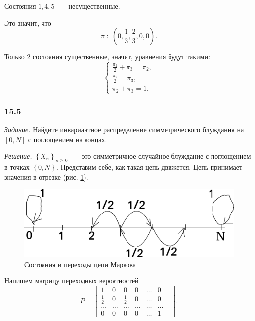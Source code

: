 \begin{enumerate}[label=\alph*)]
Состояния $1, 4, 5$~---~несущественные.

Это значит, что
\begin{equation*}
  \pi \; : \;
  \left( 0, \frac{1}{3}, \frac{2}{3}, 0, 0 \right).
\end{equation*}

Только 2 состояния существенные, значит, уравнения будут такими:
\begin{equation*}
  \begin{cases}
    \frac{ \pi_2}{2} + \pi_3 = \pi_2, \\
    \frac{ \pi_2}{2} = \pi_3, \\
    \pi_2 + \pi_3 = 1.
  \end{cases}
\end{equation*}
\end{enumerate}

\subsubsection*{15.5}

\textit{Задание.}
Найдите инвариантное распределение симметрического блуждания на $ \left[ 0, N \right] $
с поглощением на концах.

\textit{Решение.}
$ \left\{ X_n \right\}_{n \geq 0}$~---~это симметричное случайное блуждание с поглощением в точках
$ \left\{ 0, N \right\} $.
Представим себе, как такая цепь движется.
Цепь принимает значения в отрезке (рис. \ref{fig:155}).

\begin{figure}[h!]
  \centering
  \includegraphics[width=.4\textwidth]{./pictures/15_5.png}
  \caption{Состояния и переходы цепи Маркова}
  \label{fig:155}
\end{figure}

Напишем матрицу переходных вероятностей
\begin{equation*}
  P =
  \begin{bmatrix}
    1 & 0 & 0 & 0 & \dotsc & 0 \\
    \frac{1}{2} & 0 & \frac{1}{2} & 0 & \dotsc & 0 \\
    \dotsc & \dotsc & \dotsc & \dotsc & \dotsc & \dotsc & \\
    0 & 0 & 0 & 0 & \dotsc & 1
  \end{bmatrix}.
\end{equation*}

